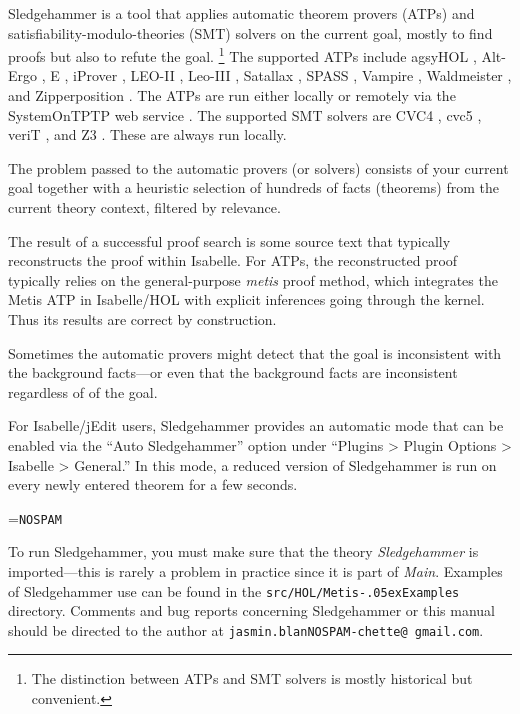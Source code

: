 \documentclass[a4paper,12pt]{article}
\renewcommand\_{\hbox{\textunderscore\kern-.05ex}}
\begin{document}
Sledgehammer is a tool that applies automatic theorem provers (ATPs)
and satisfiability-modulo-theories (SMT) solvers on the current goal, mostly
to find proofs but also to refute the goal.%
\footnote{The distinction between ATPs and SMT solvers is mostly
historical but convenient.}
%
The supported ATPs include agsyHOL \cite{agsyHOL}, Alt-Ergo \cite{alt-ergo}, E
\cite{schulz-2019}, iProver \cite{korovin-2009}, LEO-II \cite{leo2}, Leo-III
\cite{leo3}, Satallax \cite{satallax}, SPASS \cite{weidenbach-et-al-2009},
Vampire \cite{riazanov-voronkov-2002}, Waldmeister \cite{waldmeister}, and
Zipperposition \cite{cruanes-2014}. The ATPs are run either locally or remotely
via the System\-On\-TPTP web service \cite{sutcliffe-2000}. The supported SMT
solvers are CVC4 \cite{cvc4}, cvc5 \cite{barbosa-et-al-cvc5}, veriT
\cite{bouton-et-al-2009}, and Z3 \cite{de-moura-2008}. These are always run
locally.

The problem passed to the automatic provers (or solvers) consists of your
current goal together with a heuristic selection of hundreds of facts (theorems)
from the current theory context, filtered by relevance.

The result of a successful proof search is some source text that typically
reconstructs the proof within Isabelle. For ATPs, the reconstructed proof
typically relies on the general-purpose \textit{metis} proof method, which
integrates the Metis ATP in Isabelle/HOL with explicit inferences going through
the kernel. Thus its results are correct by construction.

Sometimes the automatic provers might detect that the goal is inconsistent with
the background facts---or even that the background facts are inconsistent
regardless of of the goal.

For Isabelle/jEdit users, Sledgehammer provides an automatic mode that can be
enabled via the ``Auto Sledgehammer'' option under ``Plugins > Plugin Options >
Isabelle > General.'' In this mode, a reduced version of Sledgehammer is run on
every newly entered theorem for a few seconds.

\newbox\boxA
\setbox\boxA=\hbox{\texttt{NOSPAM}}

\newcommand\authoremail{\texttt{jasmin.blan{\color{white}NOSPAM}\kern-\wd\boxA{}chette@\allowbreak
gmail.\allowbreak com}}

To run Sledgehammer, you must make sure that the theory \textit{Sledgehammer} is
imported---this is rarely a problem in practice since it is part of
\textit{Main}. Examples of Sledgehammer use can be found in the
\texttt{src/HOL/Metis\_Examples} directory.  Comments and bug reports
concerning Sledgehammer or this manual should be directed to the author at
\authoremail.
\end{document}
